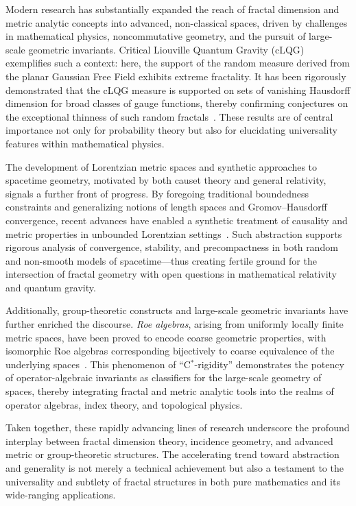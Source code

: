\documentclass[sigconf]{acmart}
\begin{document}
Modern research has substantially expanded the reach of fractal dimension and metric analytic concepts into advanced, non-classical spaces, driven by challenges in mathematical physics, noncommutative geometry, and the pursuit of large-scale geometric invariants. Critical Liouville Quantum Gravity (cLQG) exemplifies such a context: here, the support of the random measure derived from the planar Gaussian Free Field exhibits extreme fractality. It has been rigorously demonstrated that the cLQG measure is supported on sets of vanishing Hausdorff dimension for broad classes of gauge functions, thereby confirming conjectures on the exceptional thinness of such random fractals~\cite{ref81}. These results are of central importance not only for probability theory but also for elucidating universality features within mathematical physics.

The development of Lorentzian metric spaces and synthetic approaches to spacetime geometry, motivated by both causet theory and general relativity, signals a further front of progress. By foregoing traditional boundedness constraints and generalizing notions of length spaces and Gromov--Hausdorff convergence, recent advances have enabled a synthetic treatment of causality and metric properties in unbounded Lorentzian settings~\cite{ref51}. Such abstraction supports rigorous analysis of convergence, stability, and precompactness in both random and non-smooth models of spacetime---thus creating fertile ground for the intersection of fractal geometry with open questions in mathematical relativity and quantum gravity.

Additionally, group-theoretic constructs and large-scale geometric invariants have further enriched the discourse. \emph{Roe algebras}, arising from uniformly locally finite metric spaces, have been proved to encode coarse geometric properties, with isomorphic Roe algebras corresponding bijectively to coarse equivalence of the underlying spaces~\cite{ref52}. This phenomenon of ``C$^*$-rigidity'' demonstrates the potency of operator-algebraic invariants as classifiers for the large-scale geometry of spaces, thereby integrating fractal and metric analytic tools into the realms of operator algebras, index theory, and topological physics.

Taken together, these rapidly advancing lines of research underscore the profound interplay between fractal dimension theory, incidence geometry, and advanced metric or group-theoretic structures. The accelerating trend toward abstraction and generality is not merely a technical achievement but also a testament to the universality and subtlety of fractal structures in both pure mathematics and its wide-ranging applications.
\end{document}
